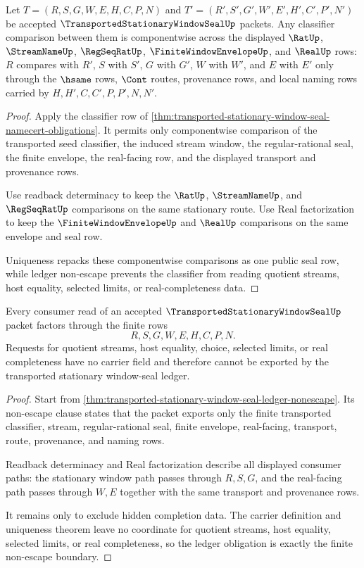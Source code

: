 \begin{theorem}
\label{thm:transported-stationary-window-seal-classifier-obligation}
Let $T=(R,S,G,W,E,H,C,P,N)$ and $T'=(R',S',G',W',E',H',C',P',N')$ be accepted $\TransportedStationaryWindowSealUp$ packets. Any classifier comparison between them is componentwise across the displayed $\RatUp$, $\StreamNameUp$, $\RegSeqRatUp$, $\FiniteWindowEnvelopeUp$, and $\RealUp$ rows: $R$ compares with $R'$, $S$ with $S'$, $G$ with $G'$, $W$ with $W'$, and $E$ with $E'$ only through the $\hsame$ rows, $\Cont$ routes, provenance rows, and local naming rows carried by $H,H',C,C',P,P',N,N'$.
\end{theorem}
\begin{proof}
Apply the classifier row of \autoref{thm:transported-stationary-window-seal-namecert-obligations}. It permits only componentwise comparison of the transported seed classifier, the induced stream window, the regular-rational seal, the finite envelope, the real-facing row, and the displayed transport and provenance rows.

Use readback determinacy to keep the $\RatUp$, $\StreamNameUp$, and $\RegSeqRatUp$ comparisons on the same stationary route. Use Real factorization to keep the $\FiniteWindowEnvelopeUp$ and $\RealUp$ comparisons on the same envelope and seal row.

Uniqueness repacks these componentwise comparisons as one public seal row, while ledger non-escape prevents the classifier from reading quotient streams, host equality, selected limits, or real-completeness data.
\end{proof}

\begin{theorem}
\label{thm:transported-stationary-window-seal-ledger-obligation}
Every consumer read of an accepted $\TransportedStationaryWindowSealUp$ packet factors through the finite rows
$$
R,S,G,W,E,H,C,P,N.
$$
Requests for quotient streams, host equality, choice, selected limits, or real completeness have no carrier field and therefore cannot be exported by the transported stationary window-seal ledger.
\end{theorem}
\begin{proof}
Start from \autoref{thm:transported-stationary-window-seal-ledger-nonescape}. Its non-escape clause states that the packet exports only the finite transported classifier, stream, regular-rational seal, finite envelope, real-facing, transport, route, provenance, and naming rows.

Readback determinacy and Real factorization describe all displayed consumer paths: the stationary window path passes through $R,S,G$, and the real-facing path passes through $W,E$ together with the same transport and provenance rows.

It remains only to exclude hidden completion data. The carrier definition and uniqueness theorem leave no coordinate for quotient streams, host equality, selected limits, or real completeness, so the ledger obligation is exactly the finite non-escape boundary.
\end{proof}

